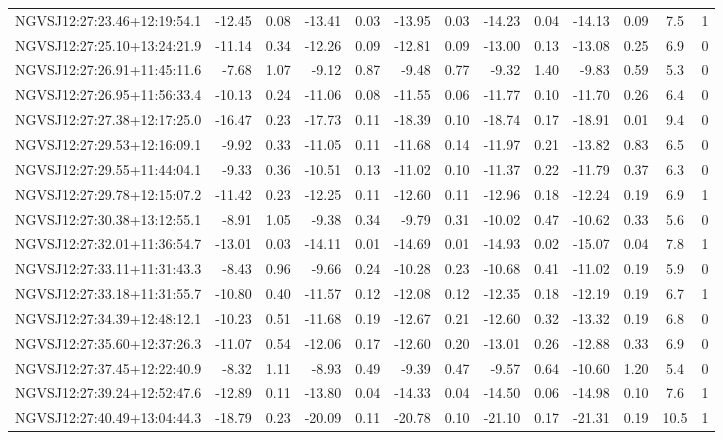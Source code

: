 \begin{tabular}{lrrrrrrrrrrcc}
NGVSJ12:27:23.46+12:19:54.1 & -12.45 & 0.08 & -13.41 & 0.03 & -13.95 & 0.03 & -14.23 & 0.04 & -14.13 & 0.09 & 7.5 & 1 \\
NGVSJ12:27:25.10+13:24:21.9 & -11.14 & 0.34 & -12.26 & 0.09 & -12.81 & 0.09 & -13.00 & 0.13 & -13.08 & 0.25 & 6.9 & 0 \\
NGVSJ12:27:26.91+11:45:11.6 & -7.68 & 1.07 & -9.12 & 0.87 & -9.48 & 0.77 & -9.32 & 1.40 & -9.83 & 0.59 & 5.3 & 0 \\
NGVSJ12:27:26.95+11:56:33.4 & -10.13 & 0.24 & -11.06 & 0.08 & -11.55 & 0.06 & -11.77 & 0.10 & -11.70 & 0.26 & 6.4 & 0 \\
NGVSJ12:27:27.38+12:17:25.0 & -16.47 & 0.23 & -17.73 & 0.11 & -18.39 & 0.10 & -18.74 & 0.17 & -18.91 & 0.01 & 9.4 & 0 \\
NGVSJ12:27:29.53+12:16:09.1 & -9.92 & 0.33 & -11.05 & 0.11 & -11.68 & 0.14 & -11.97 & 0.21 & -13.82 & 0.83 & 6.5 & 0 \\
NGVSJ12:27:29.55+11:44:04.1 & -9.33 & 0.36 & -10.51 & 0.13 & -11.02 & 0.10 & -11.37 & 0.22 & -11.79 & 0.37 & 6.3 & 0 \\
NGVSJ12:27:29.78+12:15:07.2 & -11.42 & 0.23 & -12.25 & 0.11 & -12.60 & 0.11 & -12.96 & 0.18 & -12.24 & 0.19 & 6.9 & 1 \\
NGVSJ12:27:30.38+13:12:55.1 & -8.91 & 1.05 & -9.38 & 0.34 & -9.79 & 0.31 & -10.02 & 0.47 & -10.62 & 0.33 & 5.6 & 0 \\
NGVSJ12:27:32.01+11:36:54.7 & -13.01 & 0.03 & -14.11 & 0.01 & -14.69 & 0.01 & -14.93 & 0.02 & -15.07 & 0.04 & 7.8 & 1 \\
NGVSJ12:27:33.11+11:31:43.3 & -8.43 & 0.96 & -9.66 & 0.24 & -10.28 & 0.23 & -10.68 & 0.41 & -11.02 & 0.19 & 5.9 & 0 \\
NGVSJ12:27:33.18+11:31:55.7 & -10.80 & 0.40 & -11.57 & 0.12 & -12.08 & 0.12 & -12.35 & 0.18 & -12.19 & 0.19 & 6.7 & 1 \\
NGVSJ12:27:34.39+12:48:12.1 & -10.23 & 0.51 & -11.68 & 0.19 & -12.67 & 0.21 & -12.60 & 0.32 & -13.32 & 0.19 & 6.8 & 0 \\
NGVSJ12:27:35.60+12:37:26.3 & -11.07 & 0.54 & -12.06 & 0.17 & -12.60 & 0.20 & -13.01 & 0.26 & -12.88 & 0.33 & 6.9 & 0 \\
NGVSJ12:27:37.45+12:22:40.9 & -8.32 & 1.11 & -8.93 & 0.49 & -9.39 & 0.47 & -9.57 & 0.64 & -10.60 & 1.20 & 5.4 & 0 \\
NGVSJ12:27:39.24+12:52:47.6 & -12.89 & 0.11 & -13.80 & 0.04 & -14.33 & 0.04 & -14.50 & 0.06 & -14.98 & 0.10 & 7.6 & 1 \\
NGVSJ12:27:40.49+13:04:44.3 & -18.79 & 0.23 & -20.09 & 0.11 & -20.78 & 0.10 & -21.10 & 0.17 & -21.31 & 0.19 & 10.5 & 1 \\

\end{tabular}
